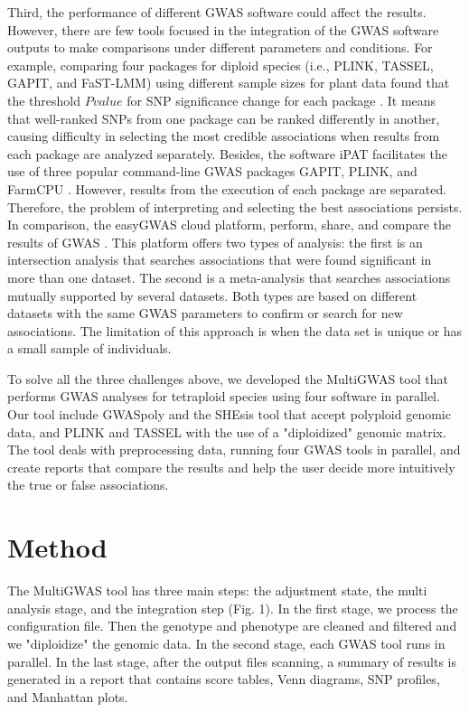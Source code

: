 \documentclass{article}
\begin{document}
Third, the performance of different GWAS software could affect the results. However, there are few tools focused in the integration of the GWAS software outputs to make comparisons under different parameters and conditions. For example, comparing four packages for diploid species (i.e., PLINK, TASSEL, GAPIT, and FaST-LMM) using different sample sizes for plant data found that the threshold $P value$ for SNP significance change for each package \cite{Yan2019}. It means that well-ranked SNPs from one package can be ranked differently in another, causing difficulty in selecting the most credible associations when results from each package are analyzed separately. Besides, the software iPAT facilitates the use of three popular command-line GWAS packages GAPIT, PLINK, and FarmCPU \cite{Zhang2018}. However, results from the execution of each package are separated. Therefore, the problem of interpreting and selecting the best associations persists. In comparison, the easyGWAS cloud platform, perform, share, and compare the results of GWAS \cite{Grimm2017}. This platform offers two types of analysis: the first is an intersection analysis that searches associations that were found significant in more than one dataset. The second is a meta-analysis that searches associations mutually supported by several datasets. Both types are based on different datasets with the same GWAS parameters to confirm or search for new associations. The limitation of this approach is when the data set is unique or has a small sample of individuals. 

To solve all the three challenges above, we developed the MultiGWAS tool that performs GWAS analyses for tetraploid species using four software in parallel. Our tool include GWASpoly \cite{Rosyara2016} and the SHEsis tool \cite{Shen2016} that accept polyploid genomic data, and PLINK \cite{Purcell2007} and TASSEL \cite{Bradbury2007} with the use of a "diploidized" genomic matrix. The tool deals with preprocessing data, running four GWAS tools in parallel, and create reports that compare the results and help the user decide more intuitively the true or false associations.


\section{Method}

The MultiGWAS tool has three main steps: the adjustment state, the multi analysis stage, and the integration step (Fig. 1). In the first stage, we process the configuration file. Then the genotype and phenotype are cleaned and filtered and  we "diploidize" the genomic data. In the second stage, each GWAS tool runs in parallel. In the last stage, after the output files scanning, a summary of results is generated in a report that contains score tables, Venn diagrams, SNP profiles, and Manhattan plots. 
\end{document}
